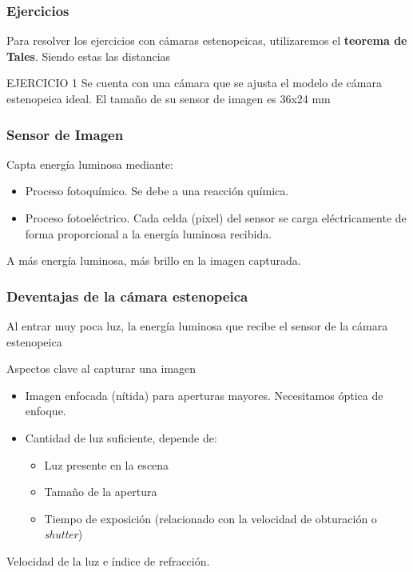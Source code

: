 \documentclass[a4paper]{book}
\begin{document}
\subsubsection{Ejercicios}

Para resolver los ejercicios con cámaras estenopeicas, utilizaremos el \textbf{teorema de Tales}. Siendo estas las distancias

EJERCICIO 1
Se cuenta con una cámara que se ajusta el modelo de cámara estenopeica ideal. El tamaño de su sensor de imagen es 36x24 mm

\subsubsection{Sensor de Imagen}

Capta energía luminosa mediante:
\begin{itemize}
	\item Proceso fotoquímico. Se debe a una reacción química.
	\item Proceso fotoeléctrico. Cada celda (pixel) del sensor se carga eléctricamente de forma proporcional a la energía luminosa recibida.
\end{itemize}

A más energía luminosa, más brillo en la imagen capturada.

\subsubsection{Deventajas de la cámara estenopeica}

Al entrar muy poca luz, la energía luminosa que recibe el sensor de la cámara estenopeica

Aspectos clave al capturar una imagen
\begin{itemize}
	\item Imagen enfocada (nítida) para aperturas mayores. Necesitamos óptica de enfoque.
	\item Cantidad de luz suficiente, depende de:
	      \begin{itemize}
		      \item Luz presente en la escena
		      \item Tamaño de la apertura
		      \item Tiempo de exposición (relacionado con la velocidad de obturación o \textit{shutter})
	      \end{itemize}
\end{itemize}

Velocidad de la luz e índice de refracción.
\end{document}
